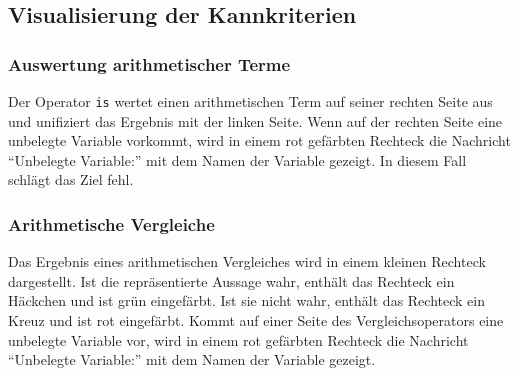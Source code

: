 \documentclass[parskip=full,11pt,twoside]{scrartcl}
\begin{document}
\begin{minipage}{\linewidth}
\end{minipage}

\begin{minipage}{\linewidth}
\end{minipage}

\subsection{Visualisierung der Kannkriterien}

\subsubsection{Auswertung arithmetischer Terme}

Der Operator \texttt{is} wertet einen arithmetischen Term auf seiner rechten Seite aus und unifiziert das Ergebnis mit der linken Seite.
Wenn auf der rechten Seite eine unbelegte Variable vorkommt, wird in einem rot gefärbten Rechteck die Nachricht \enquote{Unbelegte Variable:} mit dem Namen der Variable gezeigt.
In diesem Fall schlägt das Ziel fehl.

\begin{minipage}{\linewidth}
\end{minipage}

\subsubsection{Arithmetische Vergleiche}

Das Ergebnis eines arithmetischen Vergleiches wird in einem kleinen Rechteck dargestellt.
Ist die repräsentierte Aussage wahr, enthält das Rechteck ein Häckchen und ist grün eingefärbt.
Ist sie nicht wahr, enthält das Rechteck ein Kreuz und ist rot eingefärbt.
Kommt auf einer Seite des Vergleichsoperators eine unbelegte Variable vor, wird in einem rot gefärbten Rechteck die Nachricht \enquote{Unbelegte Variable:} mit dem Namen der Variable gezeigt.
\end{document}
